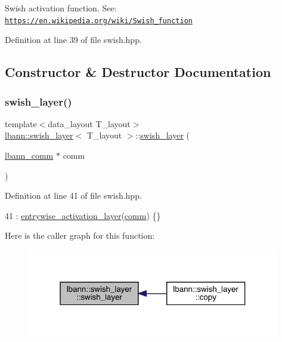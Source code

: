 Swish activation function. See\+: \href{https://en.wikipedia.org/wiki/Swish_function}{\tt https\+://en.\+wikipedia.\+org/wiki/\+Swish\+\_\+function} 

Definition at line 39 of file swish.\+hpp.



\subsection{Constructor \& Destructor Documentation}
\mbox{\label{classlbann_1_1swish__layer_a63d8d4087762ff49954270fde6b03707}} 
\subsubsection{\texorpdfstring{swish\+\_\+layer()}{swish\_layer()}}
{\footnotesize\ttfamily template$<$data\+\_\+layout T\+\_\+layout$>$ \\
\hyperlink{classlbann_1_1swish__layer}{lbann\+::swish\+\_\+layer}$<$ T\+\_\+layout $>$\+::\hyperlink{classlbann_1_1swish__layer}{swish\+\_\+layer} (\begin{DoxyParamCaption}\item[{\hyperlink{classlbann_1_1lbann__comm}{lbann\+\_\+comm} $\ast$}]{comm }\end{DoxyParamCaption})\hspace{0.3cm}{\ttfamily [inline]}}



Definition at line 41 of file swish.\+hpp.


\begin{DoxyCode}
41 : \hyperlink{classlbann_1_1entrywise__activation__layer_aada1d9200612dcd13259799ef327c557}{entrywise\_activation\_layer}(\hyperlink{file__io_8cpp_ab048c6f9fcbcfaa57ce68b00263dbebe}{comm}) \{\}
\end{DoxyCode}
Here is the caller graph for this function\+:\nopagebreak
\begin{figure}[H]
\begin{center}
\leavevmode
\includegraphics[width=313pt]{classlbann_1_1swish__layer_a63d8d4087762ff49954270fde6b03707_icgraph}
\end{center}
\end{figure}


